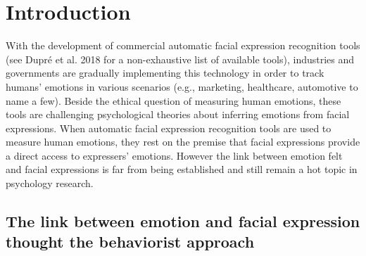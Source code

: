 \documentclass[conference,final,]{IEEEtran}
\begin{document}




\maketitle


%
\IEEEpeerreviewmaketitle


\hypertarget{introduction}{%
\section{Introduction}\label{introduction}}

With the development of commercial automatic facial expression
recognition tools (see Dupré et al. 2018 for a non-exhaustive list of
available tools), industries and governments are gradually implementing
this technology in order to track humans' emotions in various scenarios
(e.g., marketing, healthcare, automotive to name a few). Beside the
ethical question of measuring human emotions, these tools are
challenging psychological theories about inferring emotions from facial
expressions. When automatic facial expression recognition tools are used
to measure human emotions, they rest on the premise that facial
expressions provide a direct access to expressers' emotions. However the
link between emotion felt and facial expressions is far from being
established and still remain a hot topic in psychology research.

\hypertarget{the-link-between-emotion-and-facial-expression-thought-the-behaviorist-approach}{%
\subsection{The link between emotion and facial expression thought the
behaviorist
approach}\label{the-link-between-emotion-and-facial-expression-thought-the-behaviorist-approach}}
\end{document}
